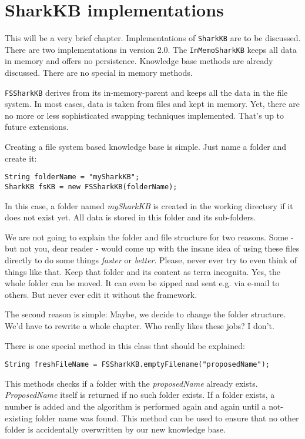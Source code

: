 \chapter{SharkKB implementations}
\label{sec:sharkkbimplementations}
This will be a very brief chapter. Implementations of {\tt SharkKB} are to be discussed. There are two implementations in version 2.0. The {\tt InMemoSharkKB} keeps all data in memory and offers no persistence. Knowledge base methods are already discussed. There are no special in memory methods.

{\tt FSSharkKB} derives from its in-memory-parent and keeps all the data in the file system. In most cases, data is taken from files and kept in memory. Yet, there are no more or less sophisticated swapping techniques implemented. That's up to future extensions.

Creating a file system based knowledge base is simple. Just name a folder and create it:

\begin{verbatim}
String folderName = "mySharkKB";
SharkKB fsKB = new FSSharkKB(folderName);
\end{verbatim}

In this case, a folder named {\it mySharkKB} is created in the working directory if it does not exist yet. All data is stored in this folder and its sub-folders. 

We are not going to explain the folder and file structure for two reasons. Some - but not you, dear reader - would come up with the insane idea of using these files directly to do some things {\it faster} or {\it better}. Please, never ever try to even think of things like that. Keep that folder and its content as terra incognita. Yes, the whole folder can be moved. It can even be zipped and sent e.g. via e-mail to others. But never ever edit it without the framework.

The second reason is simple: Maybe, we decide to change the folder structure. We'd have to rewrite a whole chapter. Who really likes these jobs? I don't.

There is one special method in this class that should be explained:

\begin{verbatim}
String freshFileName = FSSharkKB.emptyFilename("proposedName");
\end{verbatim}

This methods checks if a folder with the {\it proposedName} already exists. {\it ProposedName} itself is returned if no such folder exists. If a folder exists, a number is added and the algorithm is performed again and again until a not-existing folder name was found. This method can be used to ensure that no other folder is accidentally overwritten by our new knowledge base.
